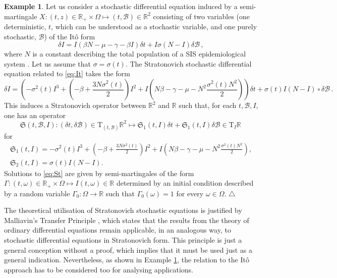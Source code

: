 \documentclass[11pt]{article}
\theoremstyle{plain}
\theoremstyle{definition}
\newcommand\xqed[1]{%
    \leavevmode\unskip\penalty9999 \hbox{}\nobreak\hfill
	\quad\hbox{#1}}
\newcommand\demo{\xqed{$\triangle$}}
\newtheorem{example}[theorem]{Example}
\newcommand{\T}{\mathrm{T}}
\begin{document}
\begin{example}\label{Ex:FirstItoStr} Let us consider a stochastic differential equation induced by a semi-martingale $X:(t,z)\in \mathbb{R}_+\times \Omega \mapsto (t,\mathcal{B})\in \mathbb{R}^2$ consisting of two variables (one deterministic, $t$, which can be understood as a stochastic variable, and one purely stochastic, $\mathcal{B}$) of the It\^{o} form
\begin{equation}\label{eq:It}
\delta I=I(\beta N-\mu-\gamma-\beta I)\delta t+I\sigma (N-I) \delta \mathcal{B}\,,
\end{equation}
where $N$ is a constant describing the total population of a SIS epidemiological system \cite{GGHMP11}. Let us assume that $\sigma=\sigma(t)$. The Stratonovich stochastic differential equation related to \eqref{eq:It} takes the form
\begin{equation}\label{eq:St}
\delta I=\left(-\sigma^2(t) I^3+\left(-\beta+\frac{3N\sigma^2(t)}{2}\right)I^2+I\left(N \beta-\gamma-\mu-N^2\frac{\sigma^2(t)N^2}{2}\right)\right)\delta t+\sigma(t) I(N-I)\circ \delta \mathcal{B}\,.
\end{equation}
This induces a Stratonovich operator between $\mathbb{R}^2$ and $\mathbb{R}$ such that, for each $t,\mathcal{B},I$, one has an operator
$$ \mathfrak{S}(t,\mathcal{B},I):(\delta t,\delta \mathcal{B})\in \T_{(t,\mathcal{B})}\mathbb{R}^2\longmapsto \mathfrak{S}_1(t,I)\delta t+\mathfrak{S}_1(t,I)\delta \mathcal{B}\in \T_I\mathbb{R}\, $$
for 
$$
\begin{gathered}
\mathfrak{S}_1(t,I)=-\sigma^2(t) I^3+\left(-\beta+\frac{3N\sigma^2(t)}{2}\right)I^2+I\left(N \beta-\gamma-\mu-N^2\frac{\sigma^2(t)N^2}{2}\right),\\
\mathfrak{S}_2(t,I)=\sigma(t) I(N-I).
\end{gathered}
$$
Solutions to \eqref{eq:St} are given by semi-martingales of the form $\Gamma:(t,\omega)\in \mathbb{R}_+\times \Omega\mapsto I(t,\omega)\in \mathbb{R}$ determined by an initial condition described by a random variable $\Gamma_0:\Omega\rightarrow \mathbb{R}$ such that $
\Gamma_0(\omega)=1$ for every $\omega\in \Omega$. \demo
\end{example}

The theoretical utilisation of Stratonovich stochastic equations is justified by Malliavin's Transfer Principle \cite{Ma78}, which states that the results from the theory of ordinary differential equations remain applicable, in an analogous way, to stochastic differential equations in Stratonovich form. This principle is just a general conception without a proof, which implies that it must be used just as a general indication. Nevertheless, as shown in Example \ref{Ex:FirstItoStr}, the relation to the It\^{o} approach has to be considered too for analysing applications.
\end{document}

